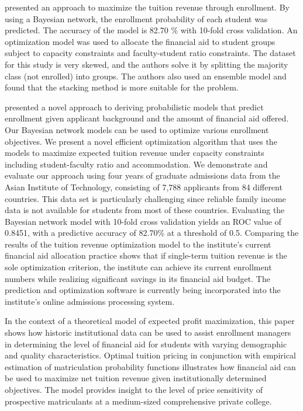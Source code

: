 \documentclass[12pt,english]{report}
\begin{document}
\citet{Thanh2007} presented an approach to maximize the tuition revenue through
enrollment. By using a Bayesian network, the enrollment probability of each
student was predicted. The accuracy of the model is 82.70 $\%$ with 10-fold
cross validation. An optimization model was used to allocate the financial aid
to
student groups subject to capacity constraints and faculty-student ratio
constraints. The dataset for this study is very skewed, and the authors solve
it by splitting the majority class (not enrolled) into groups. The authors also
used an ensemble model and found that the stacking method is more suitable for
the problem.

\citet{Thanh2007}  presented a novel approach to deriving probabilistic models
that predict enrollment given applicant background and the amount of financial
aid offered. Our Bayesian network models can be used to optimize various
enrollment objectives. We present a novel efficient optimization algorithm that
uses the models to maximize expected tuition revenue under capacity constraints
including student-faculty ratio and accommodation. We demonstrate and
evaluate
our approach using four years of graduate admissions data from the
Asian
Institute of Technology, consisting of 7,788 applicants from 84 different
countries. This data set is particularly challenging since reliable family
income data is not available for students from most of these countries.
Evaluating the Bayesian network model with 10-fold cross validation yields an
ROC value of 0.8451, with a predictive accuracy of 82.70\% at a threshold of
0.5. Comparing the results of the tuition revenue optimization model to the
institute's current financial aid allocation practice shows that if single-term
tuition revenue is the sole optimization criterion, the institute can achieve
its current enrollment numbers while realizing significant savings in its
financial aid budget. The prediction and optimization software is currently
being incorporated into the institute's online admissions processing system.

\citet{Bosshardt2010} In the context of a theoretical model of expected profit
maximization, this paper shows how historic institutional data can be used to
assist enrollment managers in determining the level of financial aid for
students with varying demographic and quality characteristics. Optimal tuition
pricing in conjunction with empirical estimation of matriculation probability
functions illustrates how financial aid can be used to maximize net tuition
revenue given institutionally determined objectives. The model provides insight
to the level of price sensitivity of prospective matriculants at a medium-sized
comprehensive private college.
\end{document}

